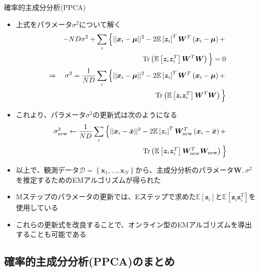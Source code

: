 \documentclass[dvipdfmx,notheorems,t]{beamer}
\begin{document}
\begin{frame}{確率的主成分分析(PPCA)}
\begin{itemize}
\begin{itemize}
		\item 上式をパラメータ$\sigma^2$について解く
		\begin{eqnarray}
			&& -ND \sigma^2 + \sum_i \left\{ || \bm{x}_i - \bm{\mu} ||^2 - 2 \mathbb{E} \left[ \bm{z}_i \right]^T \bm{W}^T \left( \bm{x}_i - \bm{\mu} \right) + \right. \nonumber \\
			&& \qquad \operatorname{Tr} \left( \mathbb{E} \left[ \bm{z}_i \bm{z}_i^T \right] \bm{W}^T \bm{W} \right) \Big\} = 0 \nonumber \\
			&\Rightarrow& \sigma^2 = \frac{1}{ND} \sum_i \left\{ || \bm{x}_i - \bm{\mu} ||^2 - 2 \mathbb{E} \left[ \bm{z}_i \right]^T \bm{W}^T \left( \bm{x}_i - \bm{\mu} \right) + \right. \nonumber \\
			&& \qquad \operatorname{Tr} \left( \mathbb{E} \left[ \bm{z}_i \bm{z}_i^T \right] \bm{W}^T \bm{W} \right) \Big\}
		\end{eqnarray}
		
		\item これより、パラメータ$\sigma^2$の更新式は次のようになる
		\begin{eqnarray}
			&& \sigma^2_\mathrm{new} \leftarrow \frac{1}{ND} \sum_i \left\{ || \bm{x}_i - \bar{\bm{x}} ||^2 - 2 \mathbb{E} \left[ \bm{z}_i \right]^T \bm{W}_\mathrm{new}^T \left( \bm{x}_i - \bar{\bm{x}} \right) + \right. \nonumber \\
			&& \qquad \operatorname{Tr} \left( \mathbb{E} \left[ \bm{z}_i \bm{z}_i^T \right] \bm{W}_\mathrm{new}^T \bm{W}_\mathrm{new} \right) \Big\}
		\end{eqnarray}
		
		\item 以上で、観測データ$\mathcal{D} = \left\{ \bm{x}_1, \ldots, \bm{x}_N \right\}$から、主成分分析のパラメータ$\bm{W}, \sigma^2$を推定するためのEMアルゴリズムが得られた
		\newline
		
		\item Mステップのパラメータの更新では、Eステップで求めた$\mathbb{E} \left[ \bm{z}_i \right]$と$\mathbb{E} \left[ \bm{z}_i \bm{z}_i^T \right]$を使用している
		\newline
		
		\item これらの更新式を改良することで、\alert{オンライン型}のEMアルゴリズムを導出することも可能である
	\end{itemize}
\end{itemize}

\end{frame}

\subsection{確率的主成分分析(PPCA)のまとめ}
\end{document}
